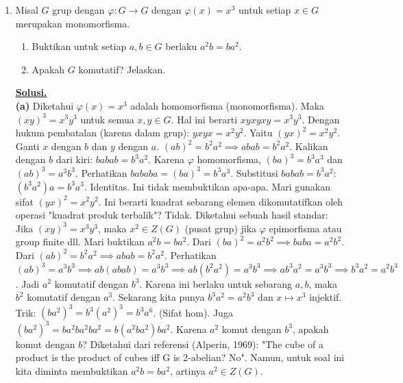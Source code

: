 \documentclass[12pt,twoside]{article}
\newenvironment{solution}
{
	\par\noindent\textbf{\underline{Solusi.}}\\
}
{
	\par
}
\begin{document}
\begin{enumerate}
  \item Misal $G$ grup dengan $\varphi : G \to G$ dengan $\varphi(x) = x^3$ untuk setiap $x \in G$ merupakan monomorfisma.

        \begin{enumerate}
          \item Buktikan untuk setiap $a,b \in G$ berlaku
                $
                  a^2 b = b a^2.
                $
          \item Apakah $G$ komutatif? Jelaskan.
        \end{enumerate}
        \begin{solution}
          \textbf{(a)} Diketahui $\varphi(x)=x^3$ adalah homomorfisma (monomorfisma).
          Maka $(xy)^3 = x^3 y^3$ untuk semua $x,y \in G$.
          Hal ini berarti $xyxyxy = x^3 y^3$.
          Dengan hukum pembatalan (karena dalam grup): $yxyx = x^2 y^2$.
          Yaitu $(yx)^2 = x^2 y^2$.
          Ganti $x$ dengan $b$ dan $y$ dengan $a$.
          $(ab)^2 = b^2 a^2 \implies abab = b^2 a^2$.
          Kalikan dengan $b$ dari kiri: $babab = b^3 a^2$.
          Karena $\varphi$ homomorfisma, $(ba)^3 = b^3 a^3$ dan $(ab)^3 = a^3 b^3$.
          Perhatikan $bababa = (ba)^3 = b^3 a^3$.
          Substitusi $babab = b^3 a^2$:
          $(b^3 a^2) a = b^3 a^3$.
          Identitas. Ini tidak membuktikan apa-apa.
          Mari gunakan sifat $(yx)^2 = x^2 y^2$. Ini berarti kuadrat sebarang elemen dikomutatifkan oleh operasi "kuadrat produk terbalik"? Tidak.
          Diketahui sebuah hasil standar: Jika $(xy)^3 = x^3 y^3$, maka $x^2 \in Z(G)$ (pusat grup) jika $\varphi$ epimorfisma atau group finite dll.
          Mari buktikan $a^2 b = b a^2$.
          Dari $(ba)^2 = a^2 b^2 \implies baba = a^2 b^2$.
          Dari $(ab)^2 = b^2 a^2 \implies abab = b^2 a^2$.
          Perhatikan $(ab)^3 = a^3 b^3 \implies ab(abab) = a^3 b^3 \implies ab(b^2 a^2) = a^3 b^3 \implies a b^3 a^2 = a^3 b^3 \implies b^3 a^2 = a^2 b^3$.
          Jadi $a^2$ komutatif dengan $b^3$.
          Karena ini berlaku untuk sebarang $a,b$, maka $b^2$ komutatif dengan $a^3$.
          Sekarang kita punya $b^3 a^2 = a^2 b^3$ dan $x \mapsto x^3$ injektif.
          Trik:
          $(ba^2)^3 = b^3 (a^2)^3 = b^3 a^6$. (Sifat hom).
          Juga $(ba^2)^3 = ba^2 ba^2 ba^2 = b (a^2 b a^2) b a^2$.
          Karena $a^2$ komut dengan $b^3$, apakah komut dengan $b$?
          Diketahui dari referensi (Alperin, 1969): "The cube of a product is the product of cubes iff G is 2-abelian? No".
          Namun, untuk soal ini kita diminta membuktikan $a^2 b = b a^2$, artinya $a^2 \in Z(G)$.

\end{solution}
\end{enumerate}
\end{document}
